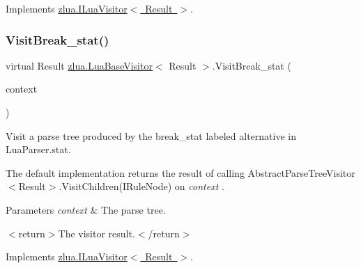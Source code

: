 Implements \mbox{\hyperlink{interfacezlua_1_1_i_lua_visitor_ac9b4c733334bfea82d43eb3b41009274}{zlua.\+I\+Lua\+Visitor$<$ Result $>$}}.

\mbox{\label{classzlua_1_1_lua_base_visitor_a0e906bc61ad12590e152305e36f80b27}} 
\subsubsection{\texorpdfstring{Visit\+Break\+\_\+stat()}{VisitBreak\_stat()}}
{\footnotesize\ttfamily virtual Result \mbox{\hyperlink{classzlua_1_1_lua_base_visitor}{zlua.\+Lua\+Base\+Visitor}}$<$ Result $>$.Visit\+Break\+\_\+stat (\begin{DoxyParamCaption}\item[{\mbox{[}\+Not\+Null\mbox{]} \mbox{\hyperlink{classzlua_1_1_lua_parser_1_1_break__stat_context}{Lua\+Parser.\+Break\+\_\+stat\+Context}}}]{context }\end{DoxyParamCaption})\hspace{0.3cm}{\ttfamily [virtual]}}



Visit a parse tree produced by the {\ttfamily break\+\_\+stat} labeled alternative in Lua\+Parser.\+stat. 

The default implementation returns the result of calling Abstract\+Parse\+Tree\+Visitor$<$\+Result$>$.\+Visit\+Children(\+I\+Rule\+Node) on {\itshape context} . 


\begin{DoxyParams}{Parameters}
{\em context} & The parse tree.\\
\hline
\end{DoxyParams}
$<$return$>$The visitor result.$<$/return$>$ 

Implements \mbox{\hyperlink{interfacezlua_1_1_i_lua_visitor_a858a13af948cd9098b3e70456040f96a}{zlua.\+I\+Lua\+Visitor$<$ Result $>$}}.

\mbox{\label{classzlua_1_1_lua_base_visitor_a9d1632ababc782344ac2324282dab1e3}} 
